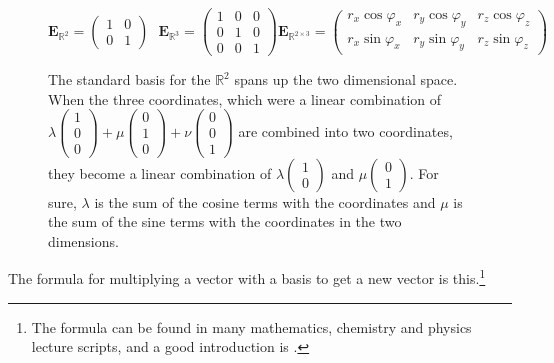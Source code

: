\documentclass[a4paper]{article}
\begin{document}
\begin{figure}
\begin{displaymath}
    \boldsymbol{E}_{\mathbb{R}^2} = \begin{pmatrix}1 & 0 \\ 0 & 1\end{pmatrix}    \mbox{          }
    \boldsymbol{E}_{\mathbb{R}^3} = \begin{pmatrix}1 & 0 & 0\\ 0 & 1 & 0 \\ 0 & 0 & 1\end{pmatrix}    
    \boldsymbol{E}_{\mathbb{R}^{2\times3}} = \begin{pmatrix}r_x\cos\varphi_x&r_y\cos\varphi_y&r_z\cos\varphi_z\\r_x\sin\varphi_x&r_y\sin\varphi_y&r_z\sin\varphi_z\end{pmatrix} 
\end{displaymath}
\caption{The standard basis for the $\mathbb{R}^{2}$ spans up the two dimensional space. When the three coordinates, which were a linear combination of $\lambda\begin{pmatrix}1\\0\\0\end{pmatrix} + \mu\begin{pmatrix}0\\1\\0\end{pmatrix} + \nu\begin{pmatrix}0\\0\\1\end{pmatrix}$ are combined into two coordinates, they become a linear combination of $\lambda\begin{pmatrix}1\\0\end{pmatrix}$ and $\mu\begin{pmatrix}0\\1\end{pmatrix}$. For sure, $\lambda$ is the sum of the cosine terms with the coordinates and $\mu$ is the sum of the sine terms with the coordinates in the two dimensions. }
\end{figure}

The formula for multiplying a vector with a basis to get a new vector is this.\footnote{The formula can be found in many mathematics, chemistry and physics lecture scripts, and a good introduction is \cite{Strang1}.}\\
\end{document}
